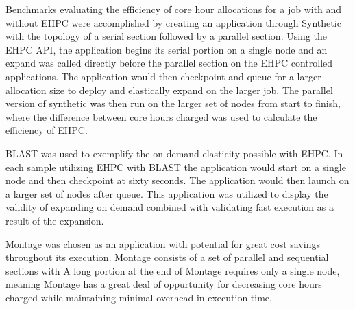 Benchmarks evaluating the efficiency of core hour allocations for a job with and without EHPC were accomplished by creating an application through Synthetic with the topology of a serial section followed by a parallel section. Using the EHPC API, the application begins its serial portion on a single node and an expand was called directly before the parallel section on the EHPC controlled applications. The application would then checkpoint and queue for a larger allocation size to deploy and elastically expand on the larger job. The parallel version of synthetic was then run on the larger set of nodes from start to finish, where the difference between core hours charged was used to calculate the efficiency of EHPC.

BLAST was used to exemplify the on demand elasticity possible with EHPC. In each sample utilizing EHPC with BLAST the application would start on a single node and then checkpoint at sixty seconds.  The application would then launch on a larger set of nodes after queue. This application was utilized to display the validity of expanding on demand combined with validating fast execution as a result of the expansion.  

Montage was chosen as an application with potential for great cost savings throughout its execution. Montage consists of a set of parallel and sequential sections with A long portion at the end of Montage requires only a single node, meaning Montage has a great deal of oppurtunity for decreasing core hours charged while maintaining minimal overhead in execution time.  

